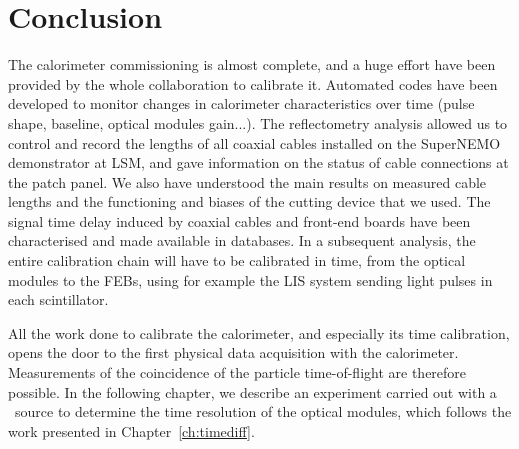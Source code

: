 \section{Conclusion}

The calorimeter commissioning is almost complete, and a huge effort have been provided by the whole collaboration to calibrate it.
Automated codes have been developed to monitor changes in calorimeter characteristics over time (pulse shape, baseline, optical modules gain...).
The reflectometry analysis allowed us to control and record the lengths of all coaxial cables installed on the SuperNEMO demonstrator at LSM, and gave information on the status of cable connections at the patch panel.
We also have understood the main results on measured cable lengths and the functioning and biases of the cutting device that we used.
The signal time delay induced by coaxial cables and front-end boards have been characterised and made available in databases.
In a subsequent analysis, the entire calibration chain will have to be calibrated in time, from the optical modules to the FEBs, using for example the LIS system sending light pulses in each scintillator.

All the work done to calibrate the calorimeter, and especially its time calibration, opens the door to the first physical data acquisition with the calorimeter.
Measurements of the coincidence of the particle time-of-flight are therefore possible.
In the following chapter, we describe an experiment carried out with a \Co\ source to determine the time resolution of the optical modules, which follows the work presented in Chapter~\ref{ch:timediff}.
